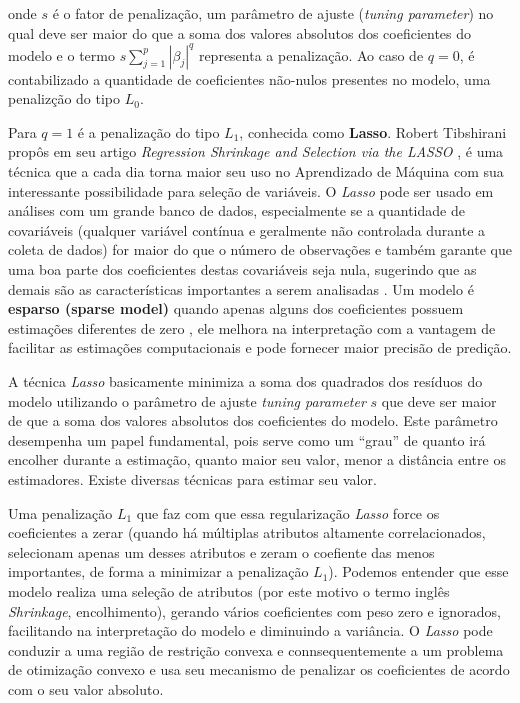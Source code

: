 \documentclass[
]{book}
\begin{document}
onde \(s\) é o fator de penalização, um parâmetro de ajuste (\emph{tuning parameter}) no qual deve ser maior do que a soma dos valores absolutos dos coeficientes do modelo e o termo \(s\displaystyle \sum^p_{j=1}|\beta_j|^q\) representa a penalização. Ao caso de \(q=0\), é contabilizado a quantidade de coeficientes não-nulos presentes no modelo, uma penalizção do tipo \textbf{\(L_0\)}.

Para \(q=1\) é a penalização do tipo \textbf{\(L_1\)}, conhecida como \textbf{Lasso}. Robert Tibshirani propôs em seu artigo \emph{Regression Shrinkage and Selection via the LASSO} \citep{tibshirani1996regression}, é uma técnica que a cada dia torna maior seu uso no Aprendizado de Máquina com sua interessante possibilidade para seleção de variáveis. O \emph{Lasso} pode ser usado em análises com um grande banco de dados, especialmente se a quantidade de covariáveis (qualquer variável contínua e geralmente não controlada durante a coleta de dados) for maior do que o número de observações e também garante que uma boa parte dos coeficientes destas covariáveis seja nula, sugerindo que as demais são as características importantes a serem analisadas \citep{silva2018tecnica}. Um modelo é \textbf{esparso (sparse model)} quando apenas alguns dos coeficientes possuem estimações diferentes de zero \citep{hastie2015statistical}, ele melhora na interpretação com a vantagem de facilitar as estimações computacionais e pode fornecer maior precisão de predição.

A técnica \emph{Lasso} basicamente minimiza a soma dos quadrados dos resíduos do modelo utilizando o parâmetro de ajuste \emph{tuning parameter} \(s\) que deve ser maior de que a soma dos valores absolutos dos coeficientes do modelo. Este parâmetro desempenha um papel fundamental, pois serve como um ``grau'' de quanto irá encolher durante a estimação, quanto maior seu valor, menor a distância entre os estimadores. Existe diversas técnicas para estimar seu valor.

Uma penalização \textbf{\(L_1\)} que faz com que essa regularização \emph{Lasso} force os coeficientes a zerar (quando há múltiplas atributos altamente correlacionados, selecionam apenas um desses atributos e zeram o coefiente das menos importantes, de forma a minimizar a penalização \(L_1\)). Podemos entender que esse modelo realiza uma seleção de atributos (por este motivo o termo inglês \emph{Shrinkage}, encolhimento), gerando vários coeficientes com peso zero e ignorados, facilitando na interpretação do modelo e diminuindo a variância. O \emph{Lasso} pode conduzir a uma região de restrição convexa e connsequentemente a um problema de otimização convexo e usa seu mecanismo de penalizar os coeficientes de acordo com o seu valor absoluto.
\end{document}

